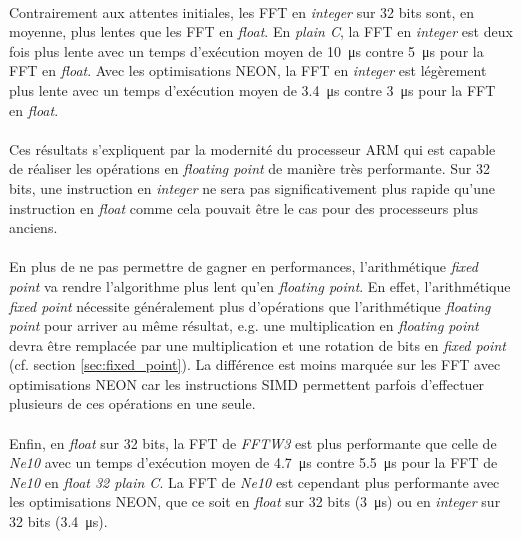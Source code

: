 \documentclass{article}
\begin{document}
    \paragraph{}
    Contrairement aux attentes initiales, les FFT en \emph{integer} sur 32 bits sont, en moyenne, plus lentes que les FFT en \emph{float}. En \emph{plain C}, la FFT en \emph{integer} est deux fois plus lente avec un temps d'exécution moyen de \SI{10}{\micro\second} contre \SI{5}{\micro\second} pour la FFT en \emph{float}. Avec les optimisations NEON, la FFT en \emph{integer} est légèrement plus lente avec un temps d'exécution moyen de \SI{3.4}{\micro\second} contre \SI{3}{\micro\second} pour la FFT en \emph{float}.

    \paragraph{}
    Ces résultats s'expliquent par la modernité du processeur ARM qui est capable de réaliser les opérations en \emph{floating point} de manière très performante\cite{DOC-ARM}. Sur 32 bits, une instruction en \emph{integer} ne sera pas significativement plus rapide qu'une instruction en \emph{float} comme cela pouvait être le cas pour des processeurs plus anciens.
    
    \paragraph{}
    En plus de ne pas permettre de gagner en performances, l'arithmétique \emph{fixed point} va rendre l'algorithme plus lent qu'en \emph{floating point}. En effet, l'arithmétique \emph{fixed point} nécessite généralement plus d'opérations que l'arithmétique \emph{floating point} pour arriver au même résultat, e.g. une multiplication en \emph{floating point} devra être remplacée par une multiplication et une rotation de bits en \emph{fixed point} (cf. section \ref{sec:fixed_point}). La différence est moins marquée sur les FFT avec optimisations NEON car les instructions SIMD permettent parfois d'effectuer plusieurs de ces opérations en une seule.

    \paragraph{}
    Enfin, en \emph{float} sur 32 bits, la FFT de \emph{FFTW3} est plus performante que celle de \emph{Ne10} avec un temps d'exécution moyen de \SI{4.7}{\micro\second} contre \SI{5.5}{\micro\second} pour la FFT de \emph{Ne10} en \emph{float 32 plain C}. La FFT de \emph{Ne10} est cependant plus performante avec les optimisations NEON, que ce soit en \emph{float} sur 32 bits (\SI{3}{\micro\second}) ou en \emph{integer} sur 32 bits (\SI{3.4}{\micro\second}).
\end{document}
